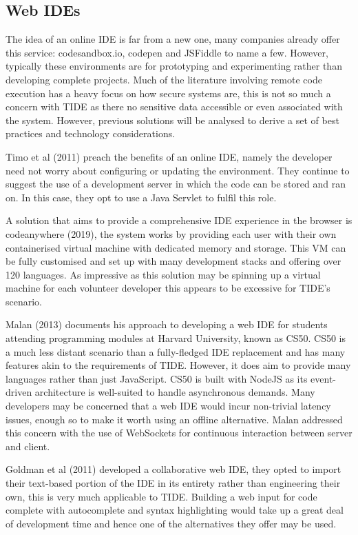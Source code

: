 \documentclass[jou,apacite]{apa6}
\begin{document}
\subsection{Web IDEs}
The idea of an online IDE is far from a new one, many companies already offer this service: codesandbox.io, codepen and JSFiddle to name a few. However, typically these environments are for prototyping and experimenting rather than developing complete projects. Much of the literature involving remote code execution has a heavy focus on how secure systems are, this is not so much a concern with TIDE as there no sensitive data accessible or even associated with the system. However, previous solutions will be analysed to derive a set of best practices and technology considerations.

Timo et al (2011) preach the benefits of an online IDE, namely the developer need not worry about configuring or updating the environment. They continue to suggest the use of a development server in which the code can be stored and ran on. In this case, they opt to use a Java Servlet to fulfil this role.

A solution that aims to provide a comprehensive IDE experience in the browser is codeanywhere (2019), the system works by providing each user with their own containerised virtual machine with dedicated memory and storage. This VM can be fully customised and set up with many development stacks and offering over 120 languages. As impressive as this solution may be spinning up a virtual machine for each volunteer developer this appears to be excessive for TIDE's scenario. 

Malan (2013) documents his approach to developing a web IDE for students attending programming modules at Harvard University, known as CS50. CS50 is a much less distant scenario than a fully-fledged IDE  replacement and has many features akin to the requirements of TIDE. However, it does aim to provide many languages rather than just JavaScript. CS50 is built with NodeJS as its event-driven architecture is well-suited to handle asynchronous demands. Many developers may be concerned that a web IDE would incur non-trivial latency issues, enough so to make it worth using an offline alternative. Malan addressed this concern with the use of WebSockets for continuous interaction between server and client.

Goldman et al (2011) developed a collaborative web IDE, they opted to import their text-based portion of the IDE in its entirety rather than engineering their own, this is very much applicable to TIDE. Building a web input for code complete with autocomplete and syntax highlighting would take up a great deal of development time and hence one of the alternatives they offer may be used. 
\end{document}
